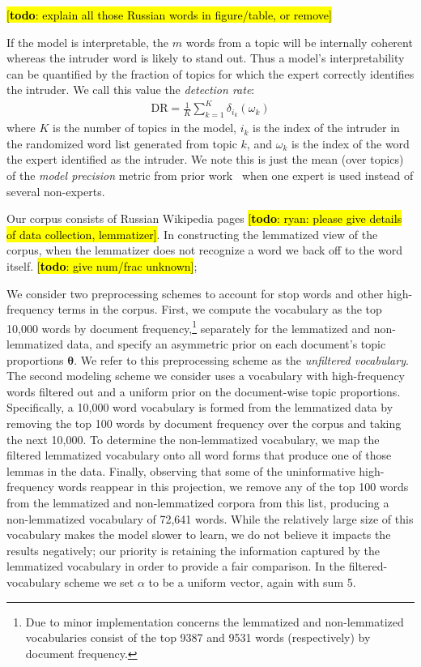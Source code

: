 \documentclass[11pt,letterpaper]{article}
\renewcommand{\vec}{\boldsymbol}   %
\newcommand{\vtheta}{{\vec{\theta}}}
\newcommand{\dirac}[2]{\delta_{#1}\left(#2\right)}
\newcommand{\DR}{\ensuremath{\textrm{DR}}}
\newcommand{\Note}[3]{\sethlcolor{#2}\hl{[\textbf{#1}: #3]}}
\newcommand{\todo}[1]{\Note{todo}{red}{#1}}
\begin{document}
{\todo{explain all those Russian words in figure/table, or remove}

If the model is interpretable, the $m$ words from a topic will be
internally coherent whereas the intruder word is likely to stand out.
Thus a model's interpretability can be quantified by the fraction
of topics for which the expert correctly identifies the intruder.  We
call this value the \emph{detection rate}:
\begin{align*}
    \DR = \frac{1}{K} \sum_{k=1}^K \dirac{i_k}{\omega_k}
\end{align*}
where $K$ is the number of topics in the model, $i_k$ is the index
of the intruder in the randomized word list generated from topic $k$,
and $\omega_k$ is the index of the word the expert identified as the
intruder.  We note this is just the mean (over topics) of the
\emph{model precision} metric from prior work~\cite{chang2009}
when one expert is used instead of several non-experts.

Our corpus consists of Russian Wikipedia pages
\todo{ryan: please give details of data collection, lemmatizer}.
In constructing the lemmatized view of the corpus, when the lemmatizer
does not recognize a word we back off to the word itself.
\todo{give num/frac unknown};

We consider two preprocessing schemes to account for stop words and
other high-frequency terms in the corpus.  First, we compute the
vocabulary as the top 10,000 words by document frequency,\footnote{
    Due to minor implementation concerns the lemmatized and
    non-lemmatized vocabularies consist of the top 9387 and 9531 words
    (respectively) by document frequency.
}
separately for the lemmatized and non-lemmatized data, and
specify an asymmetric prior on each document's topic proportions
$\vtheta$.
We refer to this preprocessing scheme
as the \emph{unfiltered vocabulary}.  The second modeling scheme we
consider uses a vocabulary with high-frequency words filtered out and a
uniform prior on the document-wise topic proportions.
Specifically, a 10,000 word vocabulary is formed from the
lemmatized data by removing the top 100 words by document frequency
over the corpus and taking the next 10,000.  To determine the
non-lemmatized vocabulary, we map the filtered lemmatized
vocabulary onto all word forms that produce one of those lemmas in
the data.  Finally, observing that some of the uninformative
high-frequency words reappear in this projection, we remove any
of the top 100 words from the lemmatized and non-lemmatized corpora
from this list, producing a non-lemmatized vocabulary of 72,641 words.
While the relatively large size of this vocabulary makes the model
slower to learn, we do not believe it impacts the results negatively;
our priority is retaining the information captured by the lemmatized
vocabulary in order to provide a fair comparison.
In the filtered-vocabulary scheme we set $\alpha$ to be a uniform
vector, again with sum 5.

}
\end{document}
